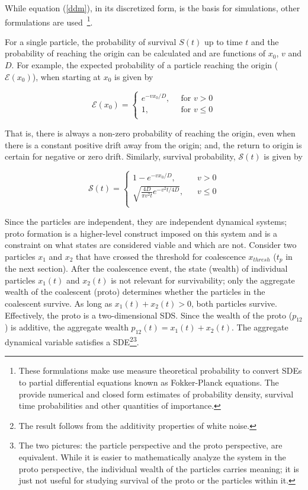 \documentclass[sigconf]{acmart}
\begin{document}
While equation (\ref{ddm}), in its discretized form, is the basis for simulations, other formulations are used~\cite{redner2001guide,rv}\footnote{These formulations make use measure theoretical probability to convert SDEs to partial differential equations known as Fokker-Planck equations.  The provide numerical and closed form estimates of probability density, survival time probabilities and other quantities of importance.}.

For a single particle, the probability of survival $S(t)$ up to time $t$ and the probability of reaching the origin can be calculated and are functions of $x_0$, $v$ and $D$. For example, the expected probability of a particle reaching the origin ($\mathcal{E}(x_0)$), when starting at $x_0$ is given by 

\begin{equation}\label{e}
\mathcal{E}(x_0) = \begin{cases}
e^{-v x_0/D} \text{, } & \text{ for } v > 0 \\
1 \text{, } & \text{ for } v \leq 0 \\
\end{cases}
\end{equation}  

\noindent That is, there is always a non-zero probability of reaching the origin, even when there is a constant positive drift away from the origin; and, the return to origin is certain for negative or zero drift.  Similarly, survival probability, $\mathcal{S}(t)$ is given by 

\begin{equation}\label{s}
\mathcal{S}(t) = \begin{cases}
1 - e^{-v x_0/D}\text{, } & \text{ } v >0 \\
\sqrt{\frac{4D}{\pi v^2 t} e^{-v^2 t/4 D}}\text{, } & \text{ } v \leq 0 \\
\end{cases}
\end{equation}

Since the particles are independent, they are independent dynamical systems; proto formation is a higher-level construct imposed on this system and is a constraint on what states are considered viable and which are not. Consider two particles $x_1$ and  $x_2$ that have crossed the threshold for coalescence $x_{thresh}$ ($t_p$ in the next section). After the coalescence event, the state (wealth) of individual particles $x_1(t)$ and  $x_2(t)$ is not relevant for survivability; only the aggregate wealth of the coalescent (proto) determines whether the particles in the coalescent survive. As long as $x_1(t) + x_2(t) >0$, both particles survive. Effectively, the proto is a two-dimensional SDS. Since the wealth of the proto ($p_{12}$) is additive, the aggregate wealth $p_{12}(t) = x_1(t) + x_2(t) $. The aggregate dynamical variable satisfies a SDE\footnote{The result follows from the additivity properties of white noise.}\footnote{The two pictures: the particle perspective and the proto perspective, are equivalent. While it is easier to mathematically analyze the system in the proto perspective, the individual wealth of the particles carries meaning; it is just not useful for studying survival of the proto or the particles within it.}.  
\end{document}
